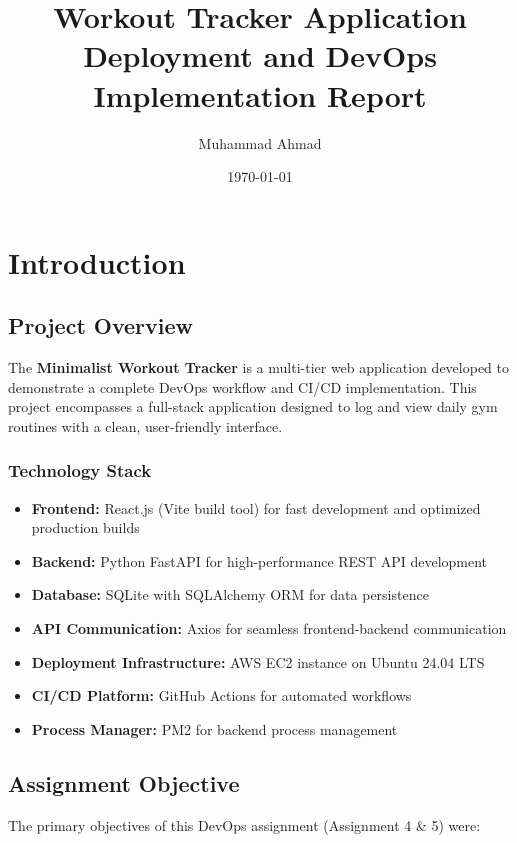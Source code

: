 \documentclass{article}
\title{\textbf{Workout Tracker Application} \\
        \Large Deployment and DevOps Implementation Report}
\author{Muhammad Ahmad}
\date{\today}
\begin{document}
\maketitle

\section{Introduction}

\subsection{Project Overview}
The \textbf{Minimalist Workout Tracker} is a multi-tier web application developed to demonstrate a complete DevOps workflow and CI/CD implementation. This project encompasses a full-stack application designed to log and view daily gym routines with a clean, user-friendly interface.

\subsubsection{Technology Stack}
\begin{itemize}
    \item \textbf{Frontend:} React.js (Vite build tool) for fast development and optimized production builds
    \item \textbf{Backend:} Python FastAPI for high-performance REST API development
    \item \textbf{Database:} SQLite with SQLAlchemy ORM for data persistence
    \item \textbf{API Communication:} Axios for seamless frontend-backend communication
    \item \textbf{Deployment Infrastructure:} AWS EC2 instance on Ubuntu 24.04 LTS
    \item \textbf{CI/CD Platform:} GitHub Actions for automated workflows
    \item \textbf{Process Manager:} PM2 for backend process management
\end{itemize}

\subsection{Assignment Objective}

The primary objectives of this DevOps assignment (Assignment 4 \& 5) were:
\end{document}
